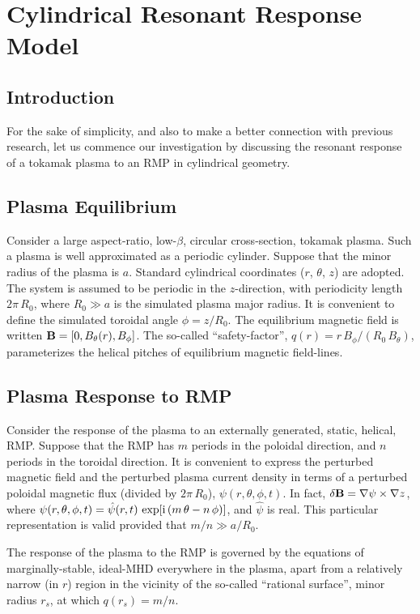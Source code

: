 \documentclass[12pt,prb,aps]{revtex4-1}
\begin{document}
\section{Cylindrical Resonant Response Model}\label{s2}
\subsection{Introduction}
For the sake of simplicity, and also to make a better connection with previous research, let us commence our investigation by discussing
the resonant response of a tokamak plasma to an RMP in cylindrical geometry. 

\subsection{Plasma Equilibrium}
Consider a large aspect-ratio, low-$\beta$, circular cross-section, tokamak plasma.
Such a plasma is well approximated as a periodic cylinder.  Suppose that the minor radius of the plasma
is $a$. Standard cylindrical coordinates ($r$, $\theta$, $z$) are adopted. The system is assumed to
be periodic in the $z$-direction, with periodicity length $2\pi\,R_0$, where $R_0\gg a$ is the simulated
plasma major radius. It is convenient to define the simulated toroidal angle $\phi=z/R_0$. 
The equilibrium magnetic field is written ${\bf B} = [0,B_\theta(r), B_\phi]$.  The
so-called ``safety-factor'', $q(r)=r\,B_\phi/(R_0\,B_\theta)$, parameterizes the helical pitches of equilibrium magnetic
field-lines. 

\subsection{Plasma Response to RMP}
Consider the response of the plasma to an externally generated, static, helical, RMP. 
Suppose that the RMP has $m$ periods in the poloidal direction, and $n$ periods in the toroidal direction.
It is convenient to express the perturbed magnetic field and the perturbed plasma current density in
terms of a perturbed poloidal magnetic flux (divided by $2\pi\,R_0$), $\psi(r,\theta,\phi,t)$. In fact, $\delta{\bf B} = \nabla\psi\times \nabla z$, 
where $\psi(r,\theta,\phi,t) = \hat{\psi}(r,t)\,\exp[{\rm i}\,(m\,\theta-n\,\phi)]$, and $\hat{\psi}$ is real. This particular representation
is valid provided that $m/n\gg a/R_0$.\cite{rfa}

The response of the plasma to the RMP is governed by the equations of marginally-stable, ideal-MHD everywhere in the
plasma, apart from a relatively narrow (in $r$) region in the vicinity of the so-called  ``rational surface'', minor radius $r_s$, 
at which $q(r_s)=m/n$.\cite{rfa}
\end{document}

